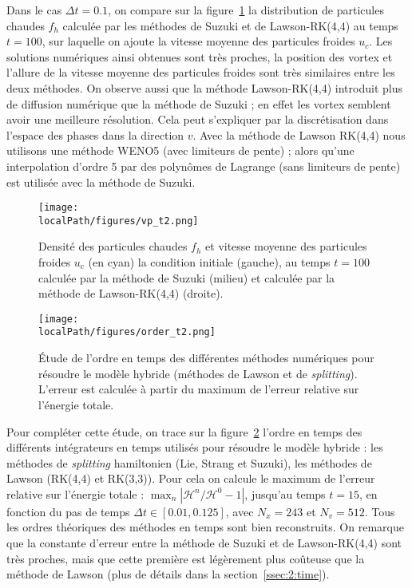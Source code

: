 Dans le cas $\Delta t=0.1$, on compare sur la figure~\ref{fig:vp:t2} la distribution de particules chaudes $f_h$ calculée par les méthodes de Suzuki et de Lawson-RK(4,4) au temps $t=100$, sur laquelle on ajoute la vitesse moyenne des particules froides $u_c$. Les solutions numériques ainsi obtenues sont très proches, la position des vortex et l'allure de la vitesse moyenne des particules froides sont très similaires entre les deux méthodes. On observe aussi que la méthode Lawson-RK(4,4) introduit plus de diffusion numérique que la méthode de Suzuki ; en effet les vortex semblent avoir une meilleure résolution. Cela peut s'expliquer par la discrétisation dans l'espace des phases dans la direction $v$. Avec la méthode de Lawson RK(4,4) nous utilisons une méthode WENO5 (avec limiteurs de pente) ; alors qu'une interpolation d'ordre 5 par des polynômes de Lagrange (sans limiteurs de pente) est utilisée avec la méthode de Suzuki.

\begin{figure}[h]
  \centering
  \texttt{[image: \\localPath/figures/vp\_t2.png]}
  \caption{Densité des particules chaudes $f_h$ et vitesse moyenne des particules froides $u_c$ (en cyan) la condition initiale (gauche), au temps $t=100$ calculée par la méthode de Suzuki (milieu) et calculée par la méthode de Lawson-RK(4,4) (droite).}
  \label{fig:vp:t2}
\end{figure}

\begin{figure}
	\centering
	\texttt{[image: \\localPath/figures/order\_t2.png]}
	\caption{Étude de l'ordre en temps des différentes méthodes numériques pour résoudre le modèle hybride (méthodes de Lawson et de \emph{splitting}). L'erreur est calculée à partir du maximum de l'erreur relative sur l'énergie totale.}
	\label{fig:order:t2}
\end{figure}

Pour compléter cette étude, on trace sur la figure~\ref{fig:order:t2} l'ordre en temps des différents intégrateurs en temps utilisés pour résoudre le modèle hybride : les méthodes de \emph{splitting} hamiltonien (Lie, Strang et Suzuki), les méthodes de Lawson (RK(4,4) et RK(3,3)). Pour cela on calcule le maximum de l'erreur relative sur l'énergie totale : $\max_n|\mathcal{H}^n/\mathcal{H}^0-1|$, jusqu'au temps $t=15$, en fonction du pas de temps $\Delta t\in[0.01,0.125]$, avec $N_x=243$ et $N_v=512$. Tous les ordres théoriques des méthodes en temps sont bien reconstruits. On remarque que la constante d'erreur entre la méthode de Suzuki et de Lawson-RK(4,4) sont très proches, mais que cette première est légèrement plus coûteuse que la méthode de Lawson (plus de détails dans la section~\ref{ssec:2:time}).

